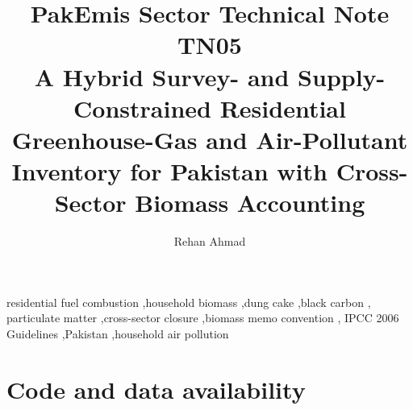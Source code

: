 \documentclass[5p,times,authoryear]{elsarticle}
\begin{document}
\begin{frontmatter}

\title{PakEmis Sector Technical Note TN05\\[4pt]
A Hybrid Survey- and Supply-Constrained Residential Greenhouse-Gas and
Air-Pollutant Inventory for Pakistan with Cross-Sector Biomass Accounting}

\author[paqi]{Rehan Ahmad}

\address[paqi]{Pakistan Air Quality Initiative (PAQI), Karachi, Pakistan}


\begin{abstract}

\end{abstract}

\begin{keyword}
residential fuel combustion \sep household biomass \sep dung cake \sep black carbon \sep
particulate matter \sep cross-sector closure \sep biomass memo convention \sep
IPCC 2006 Guidelines \sep Pakistan \sep household air pollution
\end{keyword}

\end{frontmatter}



\ReleaseCover










\FloatBarrier

\FloatBarrier



\FloatBarrier

\section*{Code and data availability}
\end{document}
